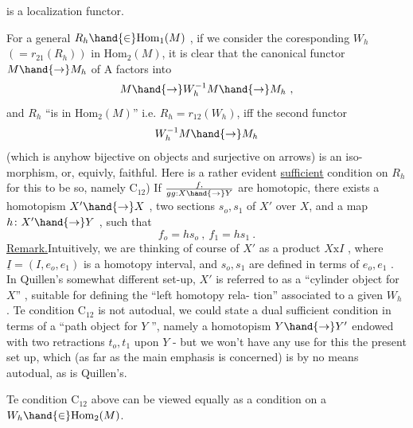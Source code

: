 
 is a localization functor.

For a general $R_h \hand{\in} \mathrm{Hom}_1(M)$ , if we consider the coresponding $W_h$
$( = r_{21}(R_h))$ in $\mathrm{Hom}_2(M)$, it is clear that the canonical functor $M \hand{\to} M_h$
of A factors into
\[ M \hand{\to} W_h^{-1}M \hand{\to} M_h \ , \]
and $R_h$ ``is in $\mathrm{Hom}_2(M)$'' i.e. $R_h = r_{12}(W_h)$, iff the second functor
\[ W_h^{-1}M \hand{\to} M_h \]
(which is anyhow bijective on objects and surjective on arrows) is an iso-%
morphism, or, equivly, faithful. Here is a rather evident 
\uline{sufficient} condition on $R_h$ for this to be so,\hand{$^*$} namely\hand{:}
 C$_{12}$) If $f,\over{g}{g} : X \hand{\to} Y$ are homotopic, there exists a homotopism
$X' \hand{\to} X$ ,  two sections $s_o,s_1$ of $X'$ over $X$, and a map $h \colon X' \hand{\to} Y$ ,
such that
\[ f_o = hs_o \ , \ f_1 = hs_1 \ . \]
\uline{Remark.}Intuitively, we are thinking of course of $X'$ as a product $X\mathrm{x}I$ , where
$\underline{I} = (I,e_o,e_1)$ is a  homotopy interval, and $s_o,s_1$ are defined in terms of
$e_o,e_1$ . In Quillen's somewhat different set-up, $X'$ is referred to as a
``cylinder object for $X$'' , suitable for defining the ``left homotopy rela-%
tion'' associated to a given $W_h$ . Te condition C$_{12}$ is not autodual,
we could state a dual sufficient condition in terms of a ``path object for
$Y$ '', namely a homotopism $Y \hand{\to} Y'$ endowed with two retractions $t_o,t_1$ upon
$Y$ - but we won't have any use for this  the present set up, which
(as far as the main emphasis is concerned) is by no means autodual, as
is Quillen's.

\margin{\unsure{$\cdot$}} Te condition C$_{12}$ above can be viewed equally as a condition on
a $W_h \hand{\in} \mathrm{Hom}_2(M)$.

